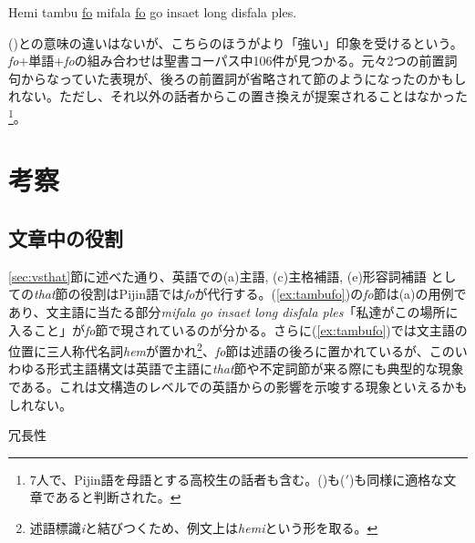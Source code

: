 \begin{exe}
 Hemi tambu \underline{fo} mifala \underline{fo} go insaet long disfala ples.
\end{exe}

()との意味の違いはないが、こちらのほうがより「強い」印象を受けるという。\textit{fo}$+$単語$+$\textit{fo}の組み合わせは聖書コーパス中106件が見つかる。元々2つの前置詞句からなっていた表現が、後ろの前置詞が省略されて節のようになったのかもしれない。ただし、それ以外の話者からこの置き換えが提案されることはなかった\footnote{7人で、Pijin語を母語とする高校生の話者も含む。()も($'$)も同様に適格な文章であると判断された。}。
\section{考察}
\subsection{文章中の役割}
\ref{sec:vsthat}節に述べた通り、英語での(a)主語, (c)主格補語, (e)形容詞補語 としての\textit{that}節の役割はPijin語では\textit{fo}が代行する。(\ref{ex:tambufo})の\textit{fo}節は(a)の用例であり、文主語に当たる部分\textit{mifala go insaet long disfala ples}「私達がこの場所に入ること」が\textit{fo}節で現されているのが分かる。さらに(\ref{ex:tambufo})では文主語の位置に三人称代名詞\textit{hem}が置かれ\footnote{述語標識\textit{i}と結びつくため、例文上は\textit{hemi}という形を取る。}、\textit{fo}節は述語の後ろに置かれているが、このいわゆる形式主語構文は英語で主語に\textit{that}節や不定詞節が来る際にも典型的な現象である\citep[1049, 1391--1392]{english}。これは文構造のレベルでの英語からの影響を示唆する現象といえるかもしれない。

冗長性
